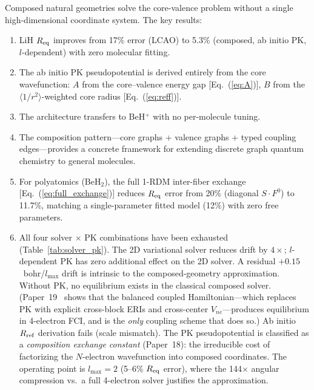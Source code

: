 \documentclass[aps,pra,twocolumn,superscriptaddress,longbibliography,floatfix]{revtex4-2}
\begin{document}
Composed natural geometries solve the core-valence problem without a
single high-dimensional coordinate system.  The key results:

\begin{enumerate}
\item LiH $R_{\rm eq}$ improves from 17\% error (LCAO) to 5.3\%
  (composed, ab initio PK, $l$-dependent) with zero molecular fitting.

\item The ab initio PK pseudopotential is derived entirely from the
  core wavefunction: $A$ from the core--valence energy gap
  [Eq.~(\ref{eq:A})], $B$ from the $\langle 1/r^2 \rangle$-weighted
  core radius [Eq.~(\ref{eq:reff})].

\item The architecture transfers to BeH$^+$ with no per-molecule
  tuning.

\item The composition pattern---core graphs + valence graphs + typed
  coupling edges---provides a concrete framework for extending discrete
  graph quantum chemistry to general molecules.

\item For polyatomics (BeH$_2$), the full 1-RDM inter-fiber exchange
  [Eq.~(\ref{eq:full_exchange})] reduces $R_{\rm eq}$ error from
  20\% (diagonal $S \cdot F^0$) to 11.7\%, matching a single-parameter
  fitted model (12\%) with zero free parameters.

\item All four solver $\times$ PK combinations have been exhausted
  (Table~\ref{tab:solver_pk}).  The 2D variational solver reduces
  drift by $4\times$; $l$-dependent PK has zero additional effect on
  the 2D solver.  A residual $+0.15$~bohr/$l_{\max}$ drift is
  intrinsic to the composed-geometry approximation.  Without PK,
  no equilibrium exists in the classical composed solver.
  (Paper~19~\cite{loutey_paper19} shows that the balanced coupled
  Hamiltonian---which replaces PK with explicit cross-block ERIs
  and cross-center $V_{ne}$---produces equilibrium in 4-electron
  FCI, and is the \emph{only} coupling scheme that does so.)
  Ab initio $R_{\rm ref}$ derivation fails
  (scale mismatch).  The PK pseudopotential is classified as a
  \emph{composition exchange constant} (Paper~18): the irreducible
  cost of factorizing the $N$-electron wavefunction into composed
  coordinates.  The operating point is $l_{\max} = 2$ (5--6\%
  $R_{\rm eq}$ error), where the 144$\times$ angular compression
  vs.\ a full 4-electron solver justifies the approximation.
\end{enumerate}
\end{document}
